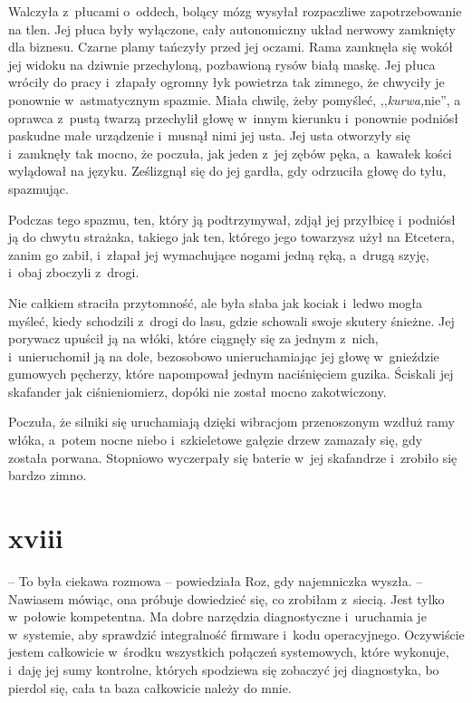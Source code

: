 \documentclass[oneside,polish,11pt,sfheadings]{mwbk}
\begin{document}
Walczyła z~płucami o~oddech, bolący mózg wysyłał rozpaczliwe
zapotrzebowanie na tlen. Jej płuca były wyłączone, cały autonomiczny
układ nerwowy zamknięty dla biznesu. Czarne plamy tańczyły przed jej
oczami. Rama zamknęła się wokół jej widoku na dziwnie przechyloną,
pozbawioną rysów białą maskę. Jej płuca wróciły do pracy i~złapały
ogromny łyk powietrza tak zimnego, że chwyciły je ponownie w~astmatycznym spazmie. Miała chwilę, żeby pomyśleć, ,,\textit{kurwa,}nie'',
a oprawca z~pustą twarzą przechylił głowę w~innym kierunku i~ponownie
podniósł paskudne małe urządzenie i~musnął nimi jej usta. Jej usta
otworzyły się i~zamknęły tak mocno, że poczuła, jak jeden z~jej zębów
pęka, a~kawałek kości wylądował na języku. Ześlizgnął się do jej gardła,
gdy odrzuciła głowę do tyłu, spazmując.

Podczas tego spazmu, ten, który ją podtrzymywał, zdjął jej przyłbicę i~podniósł ją do chwytu strażaka, takiego jak ten, którego jego towarzysz
użył na Etcetera, zanim go zabił, i~złapał jej wymachujące nogami jedną
ręką, a~drugą szyję, i~obaj zboczyli z~drogi.

Nie całkiem straciła przytomność, ale była słaba jak kociak i~ledwo
mogła myśleć, kiedy schodzili z~drogi do lasu, gdzie schowali swoje
skutery śnieżne. Jej porywacz upuścił ją na włóki, które ciągnęły się za
jednym z~nich, i~unieruchomił ją na dole, bezosobowo unieruchamiając jej
głowę w~gnieździe gumowych pęcherzy, które napompował jednym
naciśnięciem guzika. Ściskali jej skafander jak ciśnieniomierz, dopóki
nie został mocno zakotwiczony.

Poczuła, że silniki się uruchamiają dzięki wibracjom przenoszonym wzdłuż
ramy włóka, a~potem nocne niebo i~szkieletowe gałęzie drzew zamazały
się, gdy została porwana. Stopniowo wyczerpały się baterie w~jej
skafandrze i~zrobiło się bardzo zimno.

\chapter*{xviii}

-- To była ciekawa rozmowa -- powiedziała Roz, gdy najemniczka wyszła. -- Nawiasem mówiąc, ona próbuje dowiedzieć się, co zrobiłam z~siecią. Jest
tylko w~połowie kompetentna. Ma dobre narzędzia diagnostyczne i~uruchamia je w~systemie, aby sprawdzić integralność firmware i~kodu
operacyjnego. Oczywiście jestem całkowicie w~środku wszystkich połączeń
systemowych, które wykonuje, i~daję jej sumy kontrolne, których
spodziewa się zobaczyć jej diagnostyka, bo pierdol się, cała ta baza
całkowicie należy do mnie.
\end{document}
